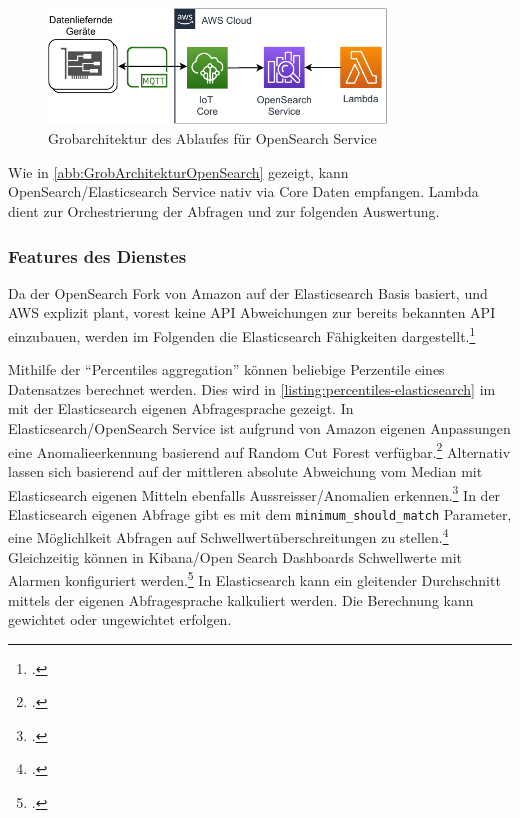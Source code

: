 \begin{figure}[H]
\centering
\includegraphics[width=0.8\textwidth]{graphics/OpenSearch-general.pdf}
\caption{Grobarchitektur des Ablaufes für OpenSearch Service}
\label{abb:GrobArchitekturOpenSearch}
\end{figure}
Wie in \autoref{abb:GrobArchitekturOpenSearch} gezeigt, kann OpenSearch/Elasticsearch Service nativ via \AWSIOT{} Core Daten empfangen. Lambda dient zur Orchestrierung der Abfragen und zur folgenden Auswertung.

\subsubsection{Features des Dienstes}
Da der OpenSearch Fork von Amazon auf der Elasticsearch Basis basiert, und \ac{AWS} explizit plant, vorest keine \ac{API} Abweichungen zur bereits bekannten \ac{API} einzubauen, werden im Folgenden die Elasticsearch Fähigkeiten dargestellt.\footcite[Vgl.][]{Meadows.2021}

Mithilfe der \enquote{Percentiles aggregation} können beliebige Perzentile eines Datensatzes berechnet werden. Dies wird in \autoref{listing:percentiles-elasticsearch} im  mit der Elasticsearch eigenen Abfragesprache gezeigt. 
In Elasticsearch/OpenSearch Service ist aufgrund von Amazon eigenen Anpassungen eine Anomalieerkennung basierend auf Random Cut Forest verfügbar.\footcite[Vgl.][]{AmazonWebServicesInc..o.J.al}
Alternativ lassen sich basierend auf der mittleren absolute Abweichung vom Median mit Elasticsearch eigenen Mitteln ebenfalls Aussreisser/Anomalien erkennen.\footcite[Vgl.][]{ElasticsearchInc..o.J.c} 
In der Elasticsearch eigenen Abfrage gibt es mit dem \texttt{minimum_should_match} Parameter, eine Möglichlkeit Abfragen auf Schwellwertüberschreitungen zu stellen.\footcite[Vgl.][]{ElasticsearchInc..o.J.e}
Gleichzeitig können in Kibana/Open Search Dashboards Schwellwerte mit Alarmen konfiguriert werden.\footcite[Vgl.][]{Handler.2019}
In Elasticsearch kann ein gleitender Durchschnitt mittels der eigenen Abfragesprache kalkuliert werden. Die Berechnung kann gewichtet oder ungewichtet erfolgen.


